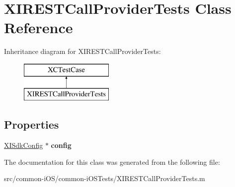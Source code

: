 \hypertarget{interface_x_i_r_e_s_t_call_provider_tests}{}\section{X\+I\+R\+E\+S\+T\+Call\+Provider\+Tests Class Reference}
\label{interface_x_i_r_e_s_t_call_provider_tests}
Inheritance diagram for X\+I\+R\+E\+S\+T\+Call\+Provider\+Tests\+:\begin{figure}[H]
\begin{center}
\leavevmode
\includegraphics[height=2.000000cm]{interface_x_i_r_e_s_t_call_provider_tests}
\end{center}
\end{figure}
\subsection*{Properties}
\begin{DoxyCompactItemize}
\item 
\hypertarget{interface_x_i_r_e_s_t_call_provider_tests_aac4a0ed6ec091c051a96827133ef9282}{}\label{interface_x_i_r_e_s_t_call_provider_tests_aac4a0ed6ec091c051a96827133ef9282} 
\hyperlink{class_x_i_sdk_config}{X\+I\+Sdk\+Config} $\ast$ {\bfseries config}
\end{DoxyCompactItemize}


The documentation for this class was generated from the following file\+:\begin{DoxyCompactItemize}
\item 
src/common-\/i\+O\+S/common-\/i\+O\+S\+Tests/X\+I\+R\+E\+S\+T\+Call\+Provider\+Tests.\+m\end{DoxyCompactItemize}
